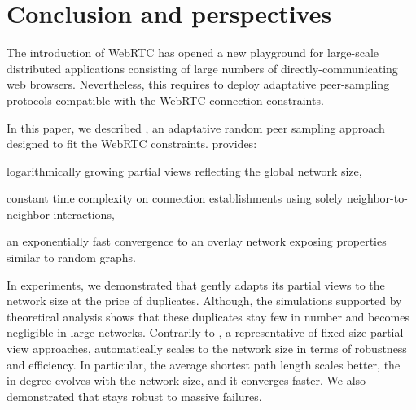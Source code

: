 
\section{Conclusion and perspectives}
\label{sec:conclusion}

The introduction of WebRTC has opened a new playground for large-scale
distributed applications consisting of large numbers of directly-communicating
web browsers. Nevertheless, this requires to deploy adaptative peer-sampling
protocols compatible with the WebRTC connection constraints.

In this paper, we described \SPRAY, an adaptative random peer sampling approach
designed to fit the WebRTC constraints.  \SPRAY provides:
\begin{inparaenum}[(i)]
\item logarithmically growing partial views reflecting the global network size,
\item constant time complexity on connection establishments using solely
  neighbor-to-neighbor interactions,
\item an exponentially fast convergence to an overlay network exposing
  properties similar to random graphs.
\end{inparaenum}

In experiments, we demonstrated that \SPRAY gently adapts its partial views to
the network size at the price of duplicates. Although, the simulations
supported by theoretical analysis shows that these duplicates stay few in
number and becomes negligible in large networks. Contrarily to \CYCLON, a
representative of fixed-size partial view approaches, \SPRAY automatically
scales to the network size in terms of robustness and efficiency. In
particular, the average shortest path length scales better, the in-degree
evolves with the network size, and it converges faster.  We also demonstrated
that \SPRAY stays robust to massive failures.



